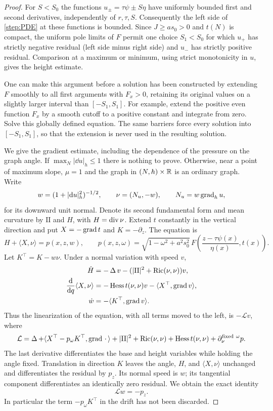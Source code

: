 \begin{proof}
For $S<S_0$ the functions $u_\pm=\tau\psi\pm S\eta$ have uniformly
bounded first and second derivatives, independently of $r,\tau,S$.
Consequently the left side of \cref{step:PDE} at these functions is
bounded.  Since $J\ge as_0>0$ and $t(N)$ is compact, the uniform pole
limits of $F$ permit one choice $S_1<S_0$ for which $u_+$ has strictly
negative residual (left side minus right side) and $u_-$ has strictly
positive residual.  Comparison at a maximum or minimum, using strict
monotonicity in $u$, gives the height estimate.

One can make this argument before a solution has been constructed by
extending $F$ smoothly to all first arguments with $F_x>0$, retaining its
original values on a slightly larger interval than $[-S_1,S_1]$.  For
example, extend the positive even function $F_x$ by a smooth cutoff to a
positive constant and integrate from zero.  Solve this globally defined
equation.  The same barriers force every solution into $[-S_1,S_1]$, so
that the extension is never used in the resulting solution.

We give the gradient estimate, including the dependence of the pressure
on the graph angle.  If $\max_N|\dd u|_h\le1$ there is nothing to prove.
Otherwise, near a point of maximum slope, $\mu=1$ and the graph in
$(N,h)\times\mathbb R$ is an ordinary graph.  Write
\[
 w=(1+|\mathrm d u|_h^2)^{-1/2},\qquad
 \nu=(N_u,-w),\qquad N_u=w\operatorname{grad}_hu,
\]
for its downward unit normal.  Denote its second fundamental form and
mean curvature by $\mathrm{II}$ and $H$, with $H=\operatorname{div}\nu$.  Extend
$t$ constantly in the vertical direction and put $X=-\operatorname{grad} t$ and
$K=-\partial_z$.  The equation is
\[
 H+\langle X,\nu\rangle=p(x,z,w),\qquad
 p(x,z,\omega)=\sqrt{1-\omega^2+a^2s_0^2}\,
 F\left(\frac{z-\tau\psi(x)}{\eta(x)},t(x)\right).
\]
Let $K^\top=K-w\nu$.  Under a normal variation with speed $v$,
\begin{align*}
 \dot H&=-\operatorname{\Delta} v-(|\mathrm{II}|^2+\operatorname{Ric}(\nu,\nu))v,\\
 \frac{\mathrm d}{\mathrm d q}\langle X,\nu\rangle
 &=-\operatorname{Hess} t(\nu,\nu)v-\langle X^\top,\operatorname{grad} v\rangle,\\
 \dot w&=-\langle K^\top,\operatorname{grad} v\rangle.
\end{align*}
Thus the linearization of the equation, with all terms moved to the
left, is $-\mathcal Lv$, where
\begin{equation}\label{step:angle-operator}
 \mathcal L=\operatorname{\Delta}+
 \langle X^\top-p_\omega K^\top,\operatorname{grad}\,\cdot\,\rangle
 +|\mathrm{II}|^2+\operatorname{Ric}(\nu,\nu)+\operatorname{Hess} t(\nu,\nu)
 +\partial_\nu^{\mathrm{fixed}\ \omega}p.
\end{equation}
The last derivative differentiates the base and height variables while
holding the angle fixed.  Translation in direction $K$ leaves the angle,
$H$, and $\langle X,\nu\rangle$ unchanged and differentiates the
residual by $p_z$.  Its normal speed is $w$; its tangential component
differentiates an identically zero residual.  We obtain the exact identity
\begin{equation}\label{step:angle-Jacobi}
 \mathcal Lw=-p_z.
\end{equation}
In particular the term $-p_\omega K^\top$ in the drift has not been
discarded.


\end{proof}
